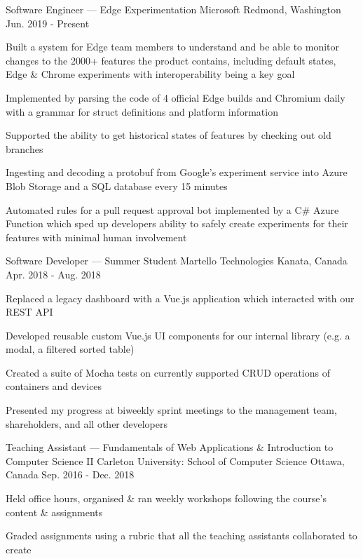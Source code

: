 
\begin{cventries}
	\cventry
		{Software Engineer --- Edge Experimentation}
		{Microsoft}
		{Redmond, Washington}
		{Jun. 2019 - Present}
		{\begin{cvitems}
			\item Built a system for Edge team members to understand and be able to monitor changes to the 2000+ features the product contains, including default states, Edge \& Chrome experiments with interoperability being a key goal
			\item Implemented by parsing the code of 4 official Edge builds and Chromium daily with a grammar for struct definitions and platform information
			\item Supported the ability to get historical states of features by checking out old branches
			\item Ingesting and decoding a protobuf from Google's experiment service into Azure Blob Storage and a SQL database every 15 minutes
			\item Automated rules for a pull request approval bot implemented by a C\# Azure Function which sped up developers ability to safely create experiments for their features with minimal human involvement
		\end{cvitems}}

	\cventry
		{Software Developer --- Summer Student}
		{Martello Technologies}
		{Kanata, Canada}
		{Apr. 2018 - Aug. 2018}
		{\begin{cvitems}
			\item Replaced a legacy dashboard with a Vue.js application which interacted with our REST API
			\item Developed reusable custom Vue.js UI components for our internal library (e.g. a modal, a filtered sorted table)
			\item Created a suite of Mocha tests on currently supported CRUD operations of containers and devices
			\item Presented my progress at biweekly sprint meetings to the management team, shareholders, and all other developers
		\end{cvitems}}

	\cventry
		{Teaching Assistant --- Fundamentals of Web Applications \& Introduction to Computer Science II}
		{Carleton University: School of Computer Science}
		{Ottawa, Canada}
		{Sep. 2016 - Dec. 2018}
		{\begin{cvitems}
			\item Held office hours, organised \& ran weekly workshops following the course's content \& assignments
			\item Graded assignments using a rubric that all the teaching assistants collaborated to create
		\end{cvitems}}
\end{cventries}